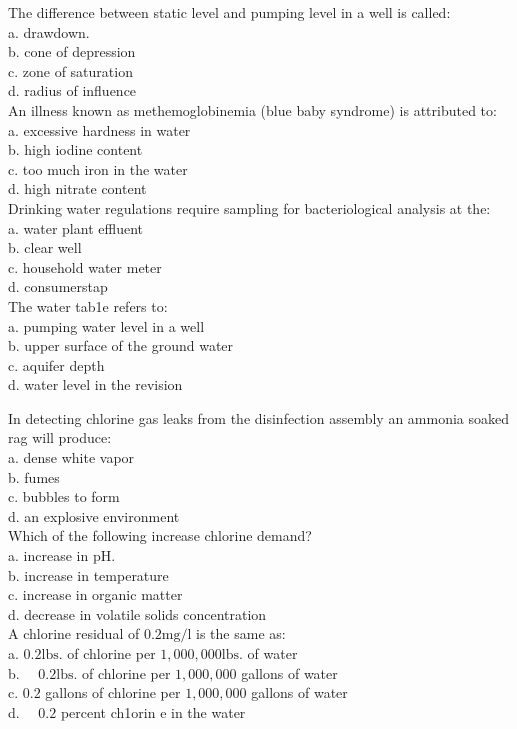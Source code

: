 The difference between static level and pumping level in a well is called:\\
a. drawdown.\\
b. cone of depression\\
c. zone of saturation\\
d. radius of influence\\

An illness known as methemoglobinemia (blue baby syndrome) is attributed to:\\
a. excessive hardness in water\\
b. high iodine content\\
c. too much iron in the water\\
d. high nitrate content\\

Drinking water regulations require sampling for bacteriological analysis at the:\\
a. water plant effluent\\
b. clear well\\
c. household water meter\\
d. consumerstap\\

The water tab1e refers to:\\
a. pumping water level in a well\\
b. upper surface of the ground water\\
c. aquifer depth\\
d. water level in the revision 

In detecting chlorine gas leaks from the disinfection assembly an ammonia soaked rag will produce:\\
a. dense white vapor\\
b. fumes\\
c. bubbles to form\\
d. an explosive environment\\

Which of the following increase chlorine demand?\\
a. increase in $\mathrm{pH}$.\\
b. increase in temperature\\
c. increase in organic matter\\
d. decrease in volatile solids concentration\\

A chlorine residual of $0.2 \mathrm{mg} / \mathrm{l}$ is the same as:\\
a. $0.2 \mathrm{lbs}$. of chlorine per $1,000,000 \mathrm{lbs}$. of water\\
b. $\quad 0.2 \mathrm{lbs}$. of chlorine per $1,000,000$ gallons of water\\
c. $0.2$ gallons of chlorine per $1,000,000$ gallons of water\\
d. $\quad 0.2$ percent ch1orin e in the water\\

